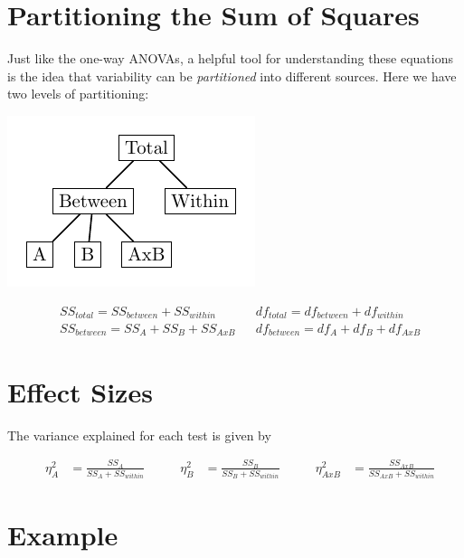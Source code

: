 \documentclass{tufte-handout}
\begin{document}
\section{Partitioning the Sum of Squares}
Just like the one-way ANOVAs, a helpful tool for understanding these equations is the idea that variability can be \emph{partitioned} into different sources. Here we have two levels of partitioning:
\begin{marginfigure}%
  \includegraphics[width=\linewidth]{anova_partition_two_way}%
  \label{fig:fullfig}%
\end{marginfigure}

\begin{align*}
&SS_{total}=SS_{between}+SS_{within} 	&	&df_{total}=df_{between}+df_{within}\\
&SS_{between}=SS_{A}+SS_{B}+SS_{AxB} 	&	&df_{between}=df_{A}+df_{B}+df_{AxB}
\end{align*}

\section{Effect Sizes}
The variance explained for each test is given by

\begin{align*}
&\eta^2_A&=\frac{SS_A}{SS_A+SS_{within}} 	\qquad
&\eta^2_B&=\frac{SS_B}{SS_B+SS_{within}} 	\qquad
&\eta^2_{AxB}&=\frac{SS_{AxB}}{SS_{AxB}+SS_{within}}
\end{align*}


\section{Example}
\end{document}
